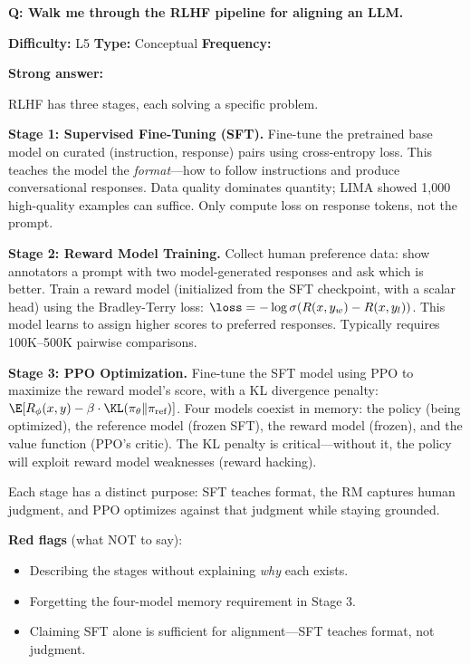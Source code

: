 \begin{interviewq}
\textbf{Q: Walk me through the RLHF pipeline for aligning an LLM.}

\textbf{Difficulty:} L5 \quad \textbf{Type:} Conceptual \quad \textbf{Frequency:} \freqhigh{}

\textbf{Strong answer:}

RLHF has three stages, each solving a specific problem.

\textbf{Stage 1: Supervised Fine-Tuning (SFT).} Fine-tune the pretrained base model on curated (instruction, response) pairs using cross-entropy loss. This teaches the model the \textit{format}---how to follow instructions and produce conversational responses. Data quality dominates quantity; LIMA showed 1,000 high-quality examples can suffice. Only compute loss on response tokens, not the prompt.

\textbf{Stage 2: Reward Model Training.} Collect human preference data: show annotators a prompt with two model-generated responses and ask which is better. Train a reward model (initialized from the SFT checkpoint, with a scalar head) using the Bradley-Terry loss: $\loss = -\log\sigma(R(x,y_w) - R(x,y_l))$. This model learns to assign higher scores to preferred responses. Typically requires 100K--500K pairwise comparisons.

\textbf{Stage 3: PPO Optimization.} Fine-tune the SFT model using PPO to maximize the reward model's score, with a KL divergence penalty: $\E[R_\phi(x,y) - \beta \cdot \KL(\pi_\theta \| \pi_{\text{ref}})]$. Four models coexist in memory: the policy (being optimized), the reference model (frozen SFT), the reward model (frozen), and the value function (PPO's critic). The KL penalty is critical---without it, the policy will exploit reward model weaknesses (reward hacking).

Each stage has a distinct purpose: SFT teaches format, the RM captures human judgment, and PPO optimizes against that judgment while staying grounded.

\textbf{Red flags} (what NOT to say):
\begin{itemize}
    \item Describing the stages without explaining \textit{why} each exists.
    \item Forgetting the four-model memory requirement in Stage 3.
    \item Claiming SFT alone is sufficient for alignment---SFT teaches format, not judgment.
\end{itemize}


\end{interviewq}

